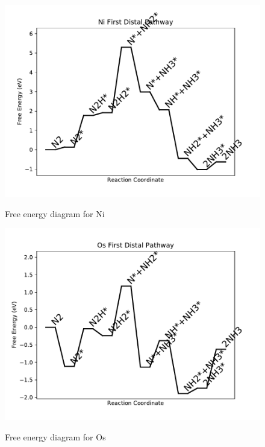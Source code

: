 \documentclass{article}
\begin{document}
\begin{figure}
\includegraphics[width=1\linewidth]{data/plots/Ni_distal_1.pdf}
\label{fig:Ni_distal_1}
\caption{Free energy diagram for Ni}
\end{figure}

\begin{figure}
\includegraphics[width=1\linewidth]{data/plots/Os_distal_1.pdf}
\label{fig:Os_distal_1}
\caption{Free energy diagram for Os}
\end{figure}
\end{document}

